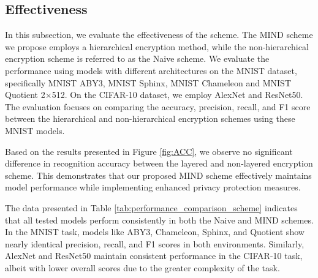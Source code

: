 \documentclass[conference]{IEEEtran}
\begin{document}
\subsection{Effectiveness}
In this subsection, we evaluate the effectiveness of the scheme. The MIND scheme we propose employs a hierarchical encryption method, while the non-hierarchical encryption scheme is referred to as the Naive scheme. We evaluate the performance using models with different architectures on the MNIST dataset, specifically MNIST ABY3\cite{10.1145/3243734.3243760}, MNIST Sphinx\cite{Tian2022SphinxEP}, MNIST Chameleon\cite{10.1145/3196494.3196522} and MNIST Quotient 2$\times$512\cite{10.1145/3319535.3339819}. On the CIFAR-10 dataset, we employ AlexNet\cite{NIPS2012_c399862d} and ResNet50\cite{7780459}. The evaluation focuses on comparing the accuracy, precision, recall, and F1 score between the hierarchical and non-hierarchical encryption schemes using these MNIST models.

Based on the results presented in Figure \ref{fig:ACC}, we observe no significant difference in recognition accuracy between the layered and non-layered encryption scheme. This demonstrates that our proposed MIND scheme effectively maintains model performance while implementing enhanced privacy protection measures.

The data presented in Table \ref{tab:performance_comparison_scheme} indicates that all tested models perform consistently in both the Naive and MIND schemes. In the MNIST task, models like ABY3, Chameleon, Sphinx, and Quotient show nearly identical precision, recall, and F1 scores in both environments. Similarly, AlexNet and ResNet50 maintain consistent performance in the CIFAR-10 task, albeit with lower overall scores due to the greater complexity of the task.
\end{document}
